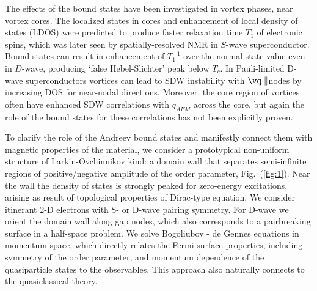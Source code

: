 \documentclass[prb,aps,showpacs,amsmath,twocolumn,10pt]{revtex4-1}
\begin{document}
%

The effects of the bound states have been investigated in vortex phases,
near vortex cores. The localized states in cores and 
enhancement of local density of states (LDOS) were
predicted\cite{Takigawa1999} to produce faster relaxation time $T_1$ of
electronic spins, which was later seen by spatially-resolved NMR in $S$-wave superconductor.\cite{Nakai2008} 
Bound states can result in enhancement of $T_1^{-1}$ over the normal state
value even in $D$-wave,\cite{Tanaka2015} producing 
`false Hebel-Slichter' peak below $T_c$. 
In Pauli-limited D-wave superconductors vortices can lead to SDW instability with $\vq
\parallel $nodes by increasing DOS for near-nodal directions.\cite{sdw_vortex}
Moreover, the core region of vortices often have enhanced SDW 
correlations\cite{Ogata1999,JXZhu2001,Ghosal2002} with $q_{AFM}$ across the
core, but again the role of the 
bound states for these correlations has not been explicitly proven. 

To clarify the role of the Andreev bound states and manifestly connect them with 
magnetic properties of the material, we consider a prototypical non-uniform
structure of Larkin-Ovchinnikov kind: a domain wall that separates
semi-infinite regions of positive/negative amplitude of the order parameter, 
Fig.~(\ref{fig:1}).
Near the wall the density of states is
strongly peaked for zero-energy excitations, arising as result of topological
properties of Dirac-type equation.\cite{Tanaka2012,Mizushima2016} 
We consider itinerant 2-D electrons with S- or D-wave pairing symmetry. 
For D-wave we orient the domain wall along gap nodes,\cite{Vorontsov2005fflo} 
which also corresponds to a pairbreaking surface in a half-space problem. 
We solve Bogoliubov - de Gennes equations in momentum space, which directly
relates the Fermi surface properties, including symmetry of the order parameter, and
momentum dependence of the quasiparticle states 
to the observables. This approach also naturally connects to the quasiclassical theory. 
\end{document}
